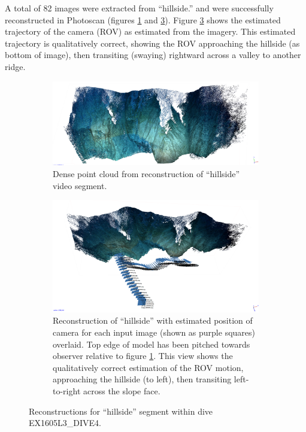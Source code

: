 \documentclass[letterpaper,12pt]{article}
\begin{document}
A total of 82 images were extracted from ``hillside.'' and were successfully reconstructed in Photoscan (figures \ref{fig:hillside_photoscan} and \ref{fig:hillside_photoscan_trajectory}).  Figure \ref{fig:hillside_photoscan_trajectory} shows the estimated trajectory of the camera (ROV) as estimated from the imagery.  This estimated trajectory is qualitatively correct, showing the ROV approaching the hillside (as bottom of image), then transiting (swaying) rightward across a valley to another ridge.   

\begin{figure}
    \centering
    \begin{subfigure}[b]{0.95\textwidth}
        \includegraphics[width=\textwidth]{images/hillside_reconstruction.png}
        \caption{Dense point cloud from reconstruction of ``hillside'' video segment.}
        \label{fig:hillside_photoscan}
    \end{subfigure}
    \vspace{12pt}
    \begin{subfigure}[b]{0.95\textwidth}
        \includegraphics[width=\textwidth]{images/hillside_reconstruction_trajectory.png}
        \caption{Reconstruction of ``hillside'' with estimated position of camera for each input image (shown as purple squares) overlaid.  Top edge of model has been pitched towards observer relative to figure \ref{fig:hillside_photoscan}.  This view shows the qualitatively correct estimation of the ROV motion, approaching the hillside (to left), then transiting left-to-right across the slope face. }
        \label{fig:hillside_photoscan_trajectory}
    \end{subfigure}
    \caption{Reconstructions for ``hillside'' segment within dive EX1605L3\_DIVE4.}
\end{figure}
\end{document}
